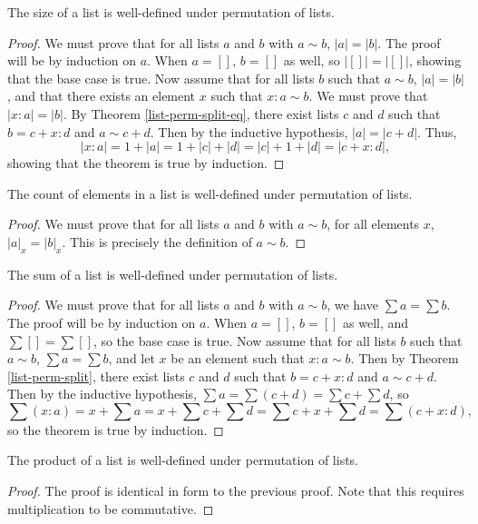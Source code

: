 \documentclass[../math.tex]{subfiles}
\begin{document}
\begin{lemma}
    The size of a list is well-defined under permutation of lists.
\end{lemma}
\begin{proof}
    We must prove that for all lists $a$ and $b$ with $a \sim b$, $|a| = |b|$.
    The proof will be by induction on $a$.  When $a = []$, $b = []$ as well, so
    $|[]| = |[]|$, showing that the base case is true.  Now assume that for all
    lists $b$ such that $a \sim b$, $|a| = |b|$, and that there exists an
    element $x$ such that $x : a \sim b$.  We must prove that $|x : a| = |b|$.
    By Theorem \ref{list-perm-split-eq}, there exist lists $c$ and $d$ such that
    $b = c + x : d$ and $a \sim c + d$.  Then by the inductive hypothesis, $|a|
    = |c + d|$.  Thus,
    \[
        |x : a| = 1 + |a| = 1 + |c| + |d| = |c| + 1 + |d| = |c + x : d|,
    \]
    showing that the theorem is true by induction.
\end{proof}

\begin{lemma}
    The count of elements in a list is well-defined under permutation of lists.
\end{lemma}
\begin{proof}
    We must prove that for all lists $a$ and $b$ with $a \sim b$, for all
    elements $x$, $|a|_x = |b|_x$.  This is precisely the definition of $a \sim
    b$.
\end{proof}

\begin{lemma}
    The sum of a list is well-defined under permutation of lists.
\end{lemma}
\begin{proof}
    We must prove that for all lists $a$ and $b$ with $a \sim b$, we have $\sum
    a = \sum b$.  The proof will be by induction on $a$.  When $a = []$, $b =
    []$ as well, and $\sum [] = \sum []$, so the base case is true.  Now assume
    that for all lists $b$ such that $a \sim b$, $\sum a = \sum b$, and let $x$
    be an element such that $x : a \sim b$.  Then by Theorem
    \ref{list-perm-split}, there exist lists $c$ and $d$ such that $b = c + x :
    d$ and $a \sim c + d$.  Then by the inductive hypothesis, $\sum a = \sum (c
    + d) = \sum c + \sum d$, so
    \[
        \sum (x : a) = x + \sum a = x + \sum c + \sum d = \sum c + x + \sum d
        = \sum (c + x : d),
    \]
    so the theorem is true by induction.
\end{proof}

\begin{lemma}
    The product of a list is well-defined under permutation of lists.
\end{lemma}
\begin{proof}
    The proof is identical in form to the previous proof.  Note that this
    requires multiplication to be commutative.
\end{proof}
\end{document}

